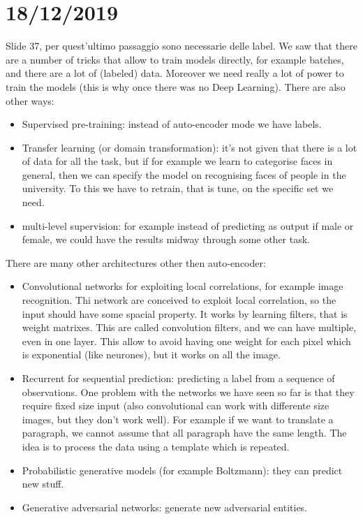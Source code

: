 \chapter{18/12/2019}
Slide 37, per quest'ultimo passaggio sono necessarie delle label.\newline
We saw that there are a number of tricks that allow to train models directly, for example batches, and there are a lot of (labeled) data. Moreover we need really a lot of power to train the models (this is why once there was no Deep Learning).\newline
There are also other ways: 
\begin{itemize}
	\item Supervised pre-training: instead of auto-encoder mode we have labels.
	\item Transfer learning (or domain transformation): it's not given that there is a lot of data for all the task, but if for example we learn to categorise faces in general, then we can specify the model on recognising faces of people in the university. To this we have to retrain, that is tune, on the specific set we need. 
	\item multi-level supervision: for example instead of predicting as output if male or female, we could have the results midway through some other task.
\end{itemize} 
There are many other architectures other then auto-encoder:
\begin{itemize}
	\item Convolutional networks for exploiting local correlations, for example image recognition. Thi network are conceived to exploit local correlation, so the input should have some spacial property. It works by learning filters, that is weight matrixes. This are called convolution filters, and we can have multiple, even in one layer. This allow to avoid having one weight for each pixel which is exponential (like neurones), but it works on all the image.
	\item Recurrent for sequential prediction: predicting a label from a sequence of observations. One problem with the networks we have seen so far is that they require fixed size input (also convolutional can work with differente size images, but they don't work well). For example if we want to translate a paragraph, we cannot assume that all paragraph have the same length. The idea is to process the data using a template which is repeated.
	\item Probabilistic generative models (for example Boltzmann): they can predict new stuff.
	\item Generative adversarial networks: generate new adversarial entities.
\end{itemize}
